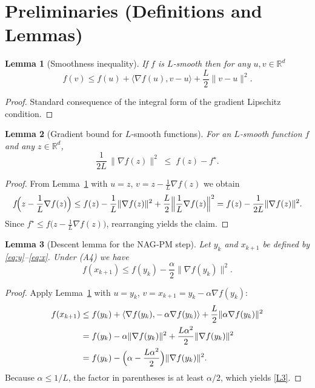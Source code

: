 \documentclass[11pt]{article}
\newtheorem{lemma}{Lemma}
\newcommand{\R}{\mathbb{R}}
\begin{document}
\section*{Preliminaries (Definitions and Lemmas)}
\begin{lemma}[Smoothness inequality]\label{lem:smooth}
If $f$ is $L$‑smooth then for any $u,v\in\R^{d}$
\[
f(v)\le f(u)+\langle\nabla f(u),v-u\rangle+\frac{L}{2}\|v-u\|^{2}.
\tag{L1}
\]
\end{lemma}
\begin{proof}
Standard consequence of the integral form of the gradient Lipschitz condition. \qedhere
\end{proof}

\begin{lemma}[Gradient bound for $L$‑smooth functions]\label{lem:grad-bound}
For an $L$‑smooth function $f$ and any $z\in\R^{d}$,
\[
\frac{1}{2L}\,\|\nabla f(z)\|^{2}\;\le\;f(z)-f^\star .
\tag{L2}
\]
\end{lemma}
\begin{proof}
From Lemma~\ref{lem:smooth} with $u=z$, $v=z-\frac{1}{L}\nabla f(z)$ we obtain
\[
f\!\Bigl(z-\frac{1}{L}\nabla f(z)\Bigr)
\le f(z)-\frac{1}{L}\|\nabla f(z)\|^{2}
+\frac{L}{2}\Bigl\|\frac{1}{L}\nabla f(z)\Bigr\|^{2}
= f(z)-\frac{1}{2L}\|\nabla f(z)\|^{2}.
\]
Since $f^\star\le f\!\bigl(z-\frac{1}{L}\nabla f(z)\bigr)$, rearranging yields the claim. \qedhere
\end{proof}

\begin{lemma}[Descent lemma for the NAG‑PM step]\label{lem:descent}
Let $y_k$ and $x_{k+1}$ be defined by \eqref{eq:y}–\eqref{eq:x}. Under (A4) we have
\[
f(x_{k+1})\le f(y_k)-\frac{\alpha}{2}\|\nabla f(y_k)\|^{2}.
\tag{L3}
\]
\end{lemma}
\begin{proof}
Apply Lemma~\ref{lem:smooth} with $u=y_k$, $v=x_{k+1}=y_k-\alpha\nabla f(y_k)$:
\[
\begin{aligned}
f(x_{k+1})
&\le f(y_k)+\langle\nabla f(y_k),-\,\alpha\nabla f(y_k)\rangle
   +\frac{L}{2}\|\alpha\nabla f(y_k)\|^{2}\\
&= f(y_k)-\alpha\|\nabla f(y_k)\|^{2}
   +\frac{L\alpha^{2}}{2}\|\nabla f(y_k)\|^{2}\\
&= f(y_k)-\Bigl(\alpha-\frac{L\alpha^{2}}{2}\Bigr)\|\nabla f(y_k)\|^{2}.
\end{aligned}
\]
Because $\alpha\le1/L$, the factor in parentheses is at least $\alpha/2$, which yields \eqref{L3}. \qedhere
\end{proof}
\end{document}

